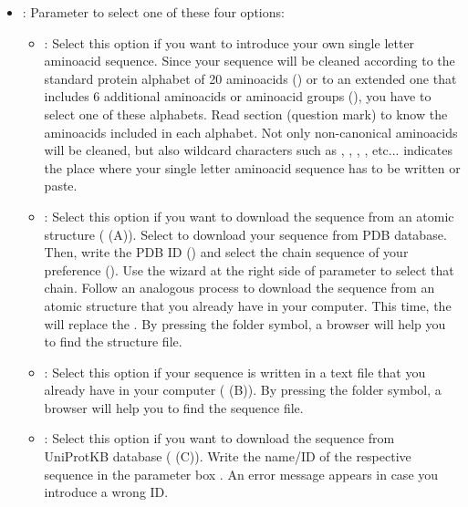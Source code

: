 \begin{itemize}
\begin{itemize}
  \begin{itemize}
  \item {}: Parameter to select one of these four options:
   \begin{itemize}
   \item {}: Select this option if you want to introduce your own single letter aminoacid sequence. Since your sequence will be cleaned according to the standard protein alphabet of 20 aminoacids () or to an extended one that includes 6 additional aminoacids or aminoacid groups (), you have to select one of these  alphabets. Read  section (question mark) to know the aminoacids included in each alphabet. Not only non-canonical aminoacids will be cleaned, but also wildcard characters such as \ttt{*}, \ttt{\#}, , \ttt{-}, etc...  indicates the place where your single letter aminoacid sequence has to be written or paste. 
   \item {}: Select this option if you want to download the sequence from an atomic structure ( (A)). Select  to download your sequence from PDB database. Then, write the PDB ID () and select the chain sequence of your preference (). Use the wizard at the right side of  parameter to select that chain. Follow an analogous process to download the sequence from an atomic structure that you already have in your computer. This time, the  will replace the . By pressing the folder symbol, a browser will help you to find the structure file.
   \item {}: Select this option if your sequence is written in a text file that you already have in your computer ( (B)). By pressing the folder symbol, a browser will help you to find the sequence file.
   \item {}: Select this option if you want to download the sequence from UniProtKB database ( (C)). Write the name/ID of the respective sequence in the parameter box . An error message appears in case you introduce a wrong ID.
   

\end{itemize}
\end{itemize}
\end{itemize}
\end{itemize}
